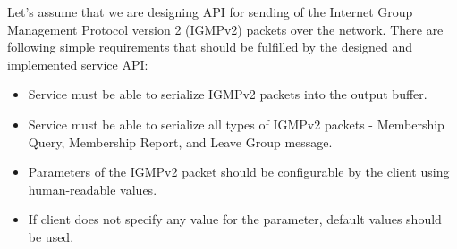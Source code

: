 Let's assume that we are designing API for sending of the Internet Group Management Protocol version 2 (IGMPv2)
packets over the network.
There are following simple requirements that should be fulfilled by the designed and implemented service API:

\begin{itemize}
    \item Service must be able to serialize IGMPv2 packets into the output buffer.
    \item Service must be able to serialize all types of IGMPv2 packets - Membership Query, Membership Report,
    and Leave Group message.
    \item Parameters of the IGMPv2 packet should be configurable by the client using human-readable values.
    \item If client does not specify any value for the parameter, default values should be used.
\end{itemize}
